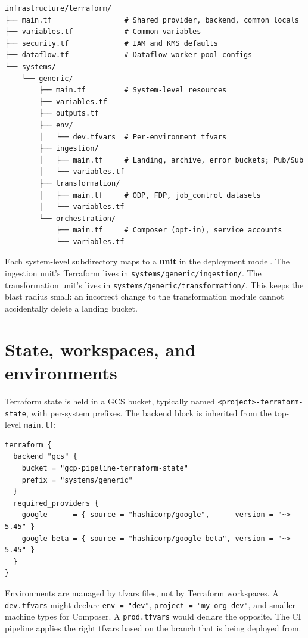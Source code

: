 \documentclass[
  11pt,
  british,
  oneside]{book}
\begin{document}
\begin{verbatim}
infrastructure/terraform/
├── main.tf                 # Shared provider, backend, common locals
├── variables.tf            # Common variables
├── security.tf             # IAM and KMS defaults
├── dataflow.tf             # Dataflow worker pool configs
└── systems/
    └── generic/
        ├── main.tf         # System-level resources
        ├── variables.tf
        ├── outputs.tf
        ├── env/
        │   └── dev.tfvars  # Per-environment tfvars
        ├── ingestion/
        │   ├── main.tf     # Landing, archive, error buckets; Pub/Sub
        │   └── variables.tf
        ├── transformation/
        │   ├── main.tf     # ODP, FDP, job_control datasets
        │   └── variables.tf
        └── orchestration/
            ├── main.tf     # Composer (opt-in), service accounts
            └── variables.tf
\end{verbatim}

Each system-level subdirectory maps to a \textbf{unit} in the deployment
model. The ingestion unit's Terraform lives in
\texttt{systems/generic/ingestion/}. The transformation unit's lives in
\texttt{systems/generic/transformation/}. This keeps the blast radius
small: an incorrect change to the transformation module cannot
accidentally delete a landing bucket.

\hypertarget{state-workspaces-and-environments}{%
\section{State, workspaces, and
environments}\label{state-workspaces-and-environments}}

Terraform state is held in a GCS bucket, typically named
\texttt{\textless{}project\textgreater{}-terraform-state}, with
per-system prefixes. The backend block is inherited from the top-level
\texttt{main.tf}:

\begin{verbatim}
terraform {
  backend "gcs" {
    bucket = "gcp-pipeline-terraform-state"
    prefix = "systems/generic"
  }
  required_providers {
    google      = { source = "hashicorp/google",      version = "~> 5.45" }
    google-beta = { source = "hashicorp/google-beta", version = "~> 5.45" }
  }
}
\end{verbatim}

Environments are managed by tfvars files, not by Terraform workspaces. A
\texttt{dev.tfvars} might declare \texttt{env\ =\ "dev"},
\texttt{project\ =\ "my-org-dev"}, and smaller machine types for
Composer. A \texttt{prod.tfvars} would declare the opposite. The CI
pipeline applies the right tfvars based on the branch that is being
deployed from.
\end{document}
